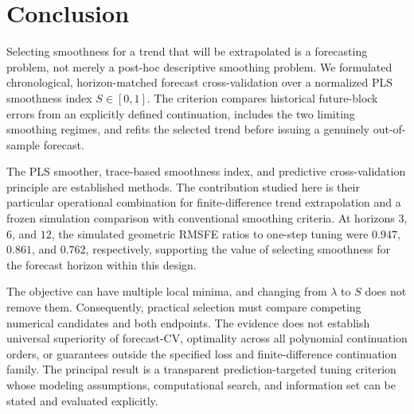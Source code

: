 \section{Conclusion}

Selecting smoothness for a trend that
will be extrapolated is a forecasting
problem, not merely a post-hoc
descriptive smoothing problem.
We formulated chronological,
horizon-matched forecast
cross-validation over a normalized
PLS smoothness index $S\in[0,1]$.
The criterion compares historical
future-block errors from an explicitly
defined continuation, includes the
two limiting smoothing regimes, and
refits the selected trend before
issuing a genuinely out-of-sample
forecast.

The PLS smoother, trace-based
smoothness index, and predictive
cross-validation principle are
established methods. The contribution
studied here is their particular
operational combination for
finite-difference trend extrapolation
and a frozen simulation comparison
with conventional smoothing criteria.
At horizons $3$, $6$, and $12$,
the simulated geometric RMSFE
ratios to one-step tuning were
$0.947$, $0.861$, and $0.762$,
respectively, supporting the value
of selecting smoothness for the
forecast horizon within this design.

The objective can have multiple
local minima, and changing from
$\lambda$ to $S$ does not remove them.
Consequently, practical selection
must compare competing numerical
candidates and both endpoints.
The evidence does not establish
universal superiority of forecast-CV,
optimality across all polynomial
continuation orders, or guarantees outside the specified loss and
finite-difference continuation family.
The principal result is a transparent
prediction-targeted tuning criterion
whose modeling assumptions,
computational search, and
information set can be stated
and evaluated explicitly.
